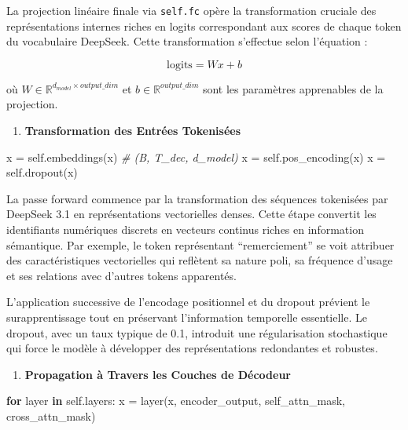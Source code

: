 \documentclass[12pt]{article}
\providecommand{\tightlist}{%
      \setlength{\itemsep}{0pt}\setlength{\parskip}{0pt}}
\newenvironment{Shaded}{}{}
\newcommand{\KeywordTok}[1]{\textcolor[rgb]{0.00,0.44,0.13}{\textbf{{#1}}}}
\newcommand{\CommentTok}[1]{\textcolor[rgb]{0.38,0.63,0.69}{\textit{{#1}}}}
\newcommand{\NormalTok}[1]{{#1}}
\newcommand{\VariableTok}[1]{\textcolor[rgb]{0.10,0.09,0.49}{{#1}}}
\newcommand{\ControlFlowTok}[1]{\textcolor[rgb]{0.00,0.44,0.13}{\textbf{{#1}}}}
\newcommand{\OperatorTok}[1]{\textcolor[rgb]{0.40,0.40,0.40}{{#1}}}
\begin{document}
La projection linéaire finale via \texttt{self.fc} opère la
transformation cruciale des représentations internes riches en logits
correspondant aux scores de chaque token du vocabulaire DeepSeek. Cette
transformation s'effectue selon l'équation :

\[
\text{logits} = Wx + b
\]

où \(W \in \mathbb{R}^{d_{model} \times output\_dim}\) et
\(b \in \mathbb{R}^{output\_dim}\) sont les paramètres apprenables de la
projection.

\begin{enumerate}
\def\labelenumi{\arabic{enumi}.}
\setcounter{enumi}{3}
\tightlist
\item
  \textbf{Transformation des Entrées Tokenisées}
\end{enumerate}

\begin{Shaded}
\begin{Highlighting}[]
\NormalTok{x }\OperatorTok{=} \VariableTok{self}\NormalTok{.embeddings(x)  }\CommentTok{\# (B, T\_dec, d\_model)}
\NormalTok{x }\OperatorTok{=} \VariableTok{self}\NormalTok{.pos\_encoding(x)}
\NormalTok{x }\OperatorTok{=} \VariableTok{self}\NormalTok{.dropout(x)}
\end{Highlighting}
\end{Shaded}

La passe forward commence par la transformation des séquences tokenisées
par DeepSeek 3.1 en représentations vectorielles denses. Cette étape
convertit les identifiants numériques discrets en vecteurs continus
riches en information sémantique. Par exemple, le token représentant
``remerciement'' se voit attribuer des caractéristiques vectorielles qui
reflètent sa nature poli, sa fréquence d'usage et ses relations avec
d'autres tokens apparentés.

L'application successive de l'encodage positionnel et du dropout
prévient le surapprentissage tout en préservant l'information temporelle
essentielle. Le dropout, avec un taux typique de 0.1, introduit une
régularisation stochastique qui force le modèle à développer des
représentations redondantes et robustes.

\begin{enumerate}
\def\labelenumi{\arabic{enumi}.}
\setcounter{enumi}{4}
\tightlist
\item
  \textbf{Propagation à Travers les Couches de Décodeur}
\end{enumerate}

\begin{Shaded}
\begin{Highlighting}[]
\ControlFlowTok{for}\NormalTok{ layer }\KeywordTok{in} \VariableTok{self}\NormalTok{.layers:}
\NormalTok{    x }\OperatorTok{=}\NormalTok{ layer(x, encoder\_output, self\_attn\_mask, cross\_attn\_mask)}
\end{Highlighting}
\end{Shaded}
\end{document}
